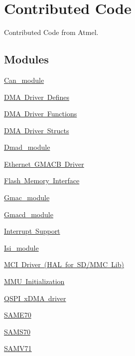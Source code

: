\hypertarget{group__RTEMSBSPsARMAtsamContrib}{}\section{Contributed Code}
\label{group__RTEMSBSPsARMAtsamContrib}


Contributed Code from Atmel.  


\subsection*{Modules}
\begin{DoxyCompactItemize}
\item 
\mbox{\hyperlink{group__can__module}{Can\+\_\+module}}
\item 
\mbox{\hyperlink{group__dmad__defines}{D\+M\+A Driver Defines}}
\item 
\mbox{\hyperlink{group__dmad__functions}{D\+M\+A Driver Functions}}
\item 
\mbox{\hyperlink{group__dmad__structs}{D\+M\+A Driver Structs}}
\item 
\mbox{\hyperlink{group__dmad__module}{Dmad\+\_\+module}}
\item 
\mbox{\hyperlink{group__gmacb__module}{Ethernet G\+M\+A\+C\+B Driver}}
\item 
\mbox{\hyperlink{group__flashd__module}{Flash Memory Interface}}
\item 
\mbox{\hyperlink{group__gmac__module}{Gmac\+\_\+module}}
\item 
\mbox{\hyperlink{group__gmacd__module}{Gmacd\+\_\+module}}
\item 
\mbox{\hyperlink{group__interrupt__group}{Interrupt Support}}
\item 
\mbox{\hyperlink{group__isi__module}{Isi\+\_\+module}}
\item 
\mbox{\hyperlink{group__mcid__module}{M\+C\+I Driver (\+H\+A\+L for S\+D/\+M\+M\+C Lib)}}
\item 
\mbox{\hyperlink{group__mmu}{M\+M\+U Initialization}}
\item 
\mbox{\hyperlink{group__qspi__dma__module}{Q\+S\+P\+I x\+D\+M\+A driver}}
\item 
\mbox{\hyperlink{group__RTEMSBSPsARMAtsamContribE70}{S\+A\+M\+E70}}
\item 
\mbox{\hyperlink{group__RTEMSBSPsARMAtsamContribS70}{S\+A\+M\+S70}}
\item 
\mbox{\hyperlink{group__RTEMSBSPsARMAtsamContribV71}{S\+A\+M\+V71}}
\item 

\end{DoxyCompactItemize}
